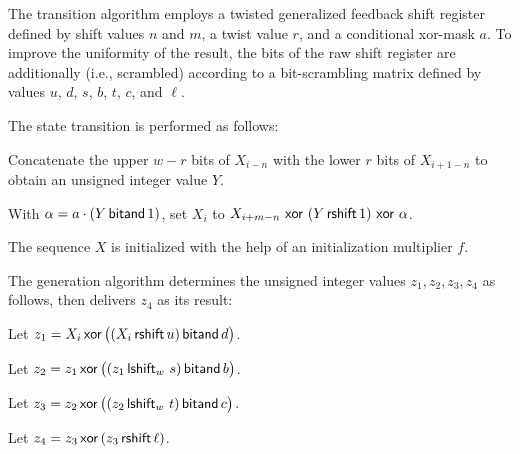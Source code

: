 \pnum
The transition algorithm%
%
employs a twisted generalized feedback shift register
defined by shift values $n$ and $m$, a twist value $r$,
and a conditional xor-mask $a$.
To improve the uniformity of the result,
the bits of the raw shift register are additionally 
(i.e., scrambled) according to a bit-scrambling matrix
defined by values $u$, $d$, $s$, $b$, $t$, $c$, and $\ell$.

The state transition is performed as follows:
\begin{enumeratea}
 \item
   Concatenate
     the upper $w-r$ bits of $X_{i-n}$
   with
     the lower $r$ bits of $X_{i+1-n}$
   to obtain an unsigned integer value $Y$.
 \item
   With $\alpha = a \cdot (Y \, \mathsf{bitand} \, 1)$,
   set $X_i$ to
     $X_{i+m-n} \, \, \mathsf{xor} \, \, (Y \, \mathsf{rshift} \, 1) \, \, \mathsf{xor} \, \, \alpha$.
\end{enumeratea}
The sequence $X$ is initialized
with the help of an initialization multiplier $f$.

\pnum
The generation algorithm%
%
 determines the unsigned integer values $z_1, z_2, z_3, z_4$ as follows,
 then delivers $z_4$ as its result:
\begin{enumeratea}
 \item
   Let $z_1 = X_i \, \mathsf{xor} \, \bigl(( X_i \, \mathsf{rshift} \, u ) \, \mathsf{bitand} \, d\bigr)$.
 \item
   Let $z_2 = z_1 \, \mathsf{xor} \, \bigl( (z_1 \, \mathsf{lshift}_w \, \, s) \, \mathsf{bitand} \, b \bigr)$.
 \item
   Let $z_3 = z_2 \, \mathsf{xor} \, \bigl( (z_2 \, \mathsf{lshift}_w \, \, t) \, \mathsf{bitand} \, c \bigr)$.
 \item
   Let $z_4 = z_3 \, \mathsf{xor} \, ( z_3 \, \mathsf{rshift} \, \ell )$.
\end{enumeratea}

